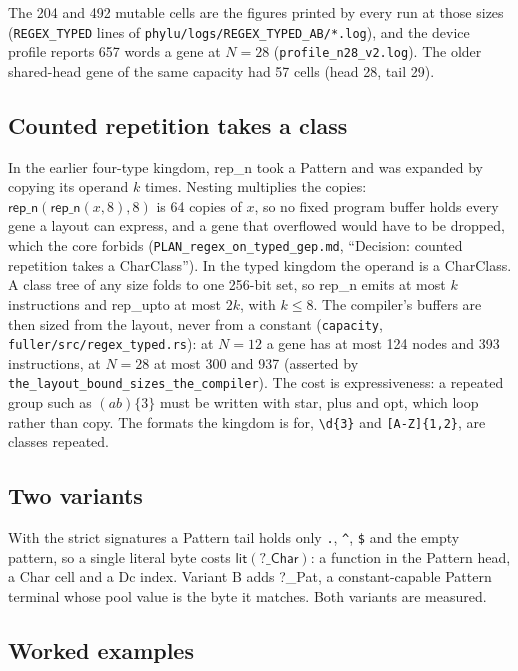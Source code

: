 \documentclass[sigconf,nonacm]{acmart}
\newcommand{\rx}{\lstinline[style=mono]}
\newcommand{\ty}[1]{\textsf{#1}}
\newcommand{\sym}[1]{\textsf{#1}}
\newcommand{\src}[1]{{\small\nolinkurl{#1}}}
\begin{document}
The 204 and 492 mutable cells are the figures printed by every run at those
sizes (\src{REGEX_TYPED} lines of \src{phylu/logs/REGEX_TYPED_AB/*.log}),
and the device profile reports 657 words a gene at $N=28$
(\src{profile_n28_v2.log}). The older shared-head gene of the same capacity
had 57 cells (head 28, tail 29).

\subsection{Counted repetition takes a class}

In the earlier four-type kingdom, \sym{rep\_n} took a \ty{Pattern} and was
expanded by copying its operand $k$ times. Nesting multiplies the copies:
$\sym{rep\_n}(\sym{rep\_n}(x,8),8)$ is 64 copies of $x$, so no fixed program
buffer holds every gene a layout can express, and a gene that overflowed would
have to be dropped, which the core forbids
(\src{PLAN_regex_on_typed_gep.md}, ``Decision: counted repetition takes a
CharClass''). In the typed kingdom the operand is a \ty{CharClass}. A class tree
of any size folds to one 256-bit set, so \sym{rep\_n} emits at most $k$
instructions and \sym{rep\_upto} at most $2k$, with $k\le 8$. The compiler's
buffers are then sized from the layout, never from a constant
(\texttt{capacity}, \src{fuller/src/regex_typed.rs}): at $N=12$ a gene has at
most 124 nodes and 393 instructions, at $N=28$ at most 300 and 937 (asserted by
\src{the_layout_bound_sizes_the_compiler}). The cost is expressiveness: a
repeated group such as $(ab)\{3\}$ must be written with \sym{star}, \sym{plus}
and \sym{opt}, which loop rather than copy. The formats the kingdom is for,
\rx!\d{3}! and \rx![A-Z]{1,2}!, are classes repeated.

\subsection{Two variants}

With the strict signatures a \ty{Pattern} tail holds only \rx!.!, \rx!^!,
\rx!$! and the empty pattern, so a single literal byte costs
$\sym{lit}(\sym{?\_Char})$: a function in the \ty{Pattern} head, a \ty{Char} cell
and a Dc index. Variant B adds \sym{?\_Pat}, a constant-capable \ty{Pattern}
terminal whose pool value is the byte it matches. Both variants are measured.

\subsection{Worked examples}
\end{document}
